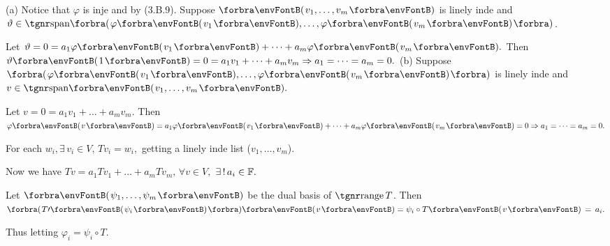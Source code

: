 \documentclass[a4paper, 11pt, UTF8]{article}
\begin{document}
\begin{large}
\par\quad
(a) Notice that $\varphi$ is inje and by (3.B.9).\PfEnd\vspace{4pt}\quad\Ha
\Or Suppose $\Par{v_1,\dots,v_m}$ is linely inde and $\vartheta\in\Span[\BigPar]{\varphi\Par{v_1},\dots,\varphi\Par{v_m}}$.\par\quad\Ha
Let $\vartheta=0=a_1\varphi\Par{v_1}+\dots+a_m\varphi\Par{v_m}.$ Then $\vartheta\Par{1}=0=a_1 v_1+\dots+a_m v_m\Rightarrow a_1=\dots=a_m=0.$\PfEnd\vspace{6pt}\quad
(b) Suppose $\BigPar{\varphi\Par{v_1},\dots,\varphi\Par{v_m}}$ is linely inde and $v\in\Span{v_1,\dots,v_m}.$\par\quad\Hb
Let $v=0=a_1 v_1+\dots+a_m v_m.$ Then $\varphi\Par{v}=a_1\varphi\Par{v_1}+\dots+a_m\varphi\Par{v_m}=0 \Rightarrow a_1=\dots=a_m=0.$\PfEnd
\SepLine\pagebreak

\par\quad
For each $w_{i},\exists\,v_{i} \in V,\,Tv_{i}=w_{i},$
getting a linely inde list ($v_1,\dots, v_m$).\par\quad
Now we have $Tv=a_1Tv_1+\dots+a_mTv_m,\,\forall v \in V,$ $\exists\,!\,a_{i}\in{\mathbb{F}}.$\par\quad
Let $\Par{\psi_1, \dots, \psi_m}$ be the dual basis of $\range T$. Then $\BigPar{T\apostrophe\Par{\psi_{i}}}\Par{v}=\psi_{i}\circ T\Par{v}\,=\,a_{i}.$\par\quad
Thus letting $\varphi_{i}=\psi_{i}\circ T.$\PfEnd
\SepLine


\end{large}
\end{document}
